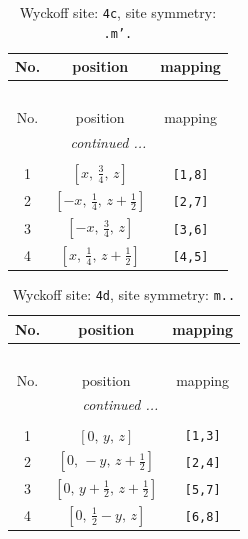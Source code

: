 \documentclass[fleqn,8pt]{jsarticle}
\begin{document}
\renewcommand{\arraystretch}{1.2}
\begin{longtable}{ccc}
\caption{Wyckoff site: {\tt 4c}, site symmetry: {\tt .m'.}}
 \\
 \hline \hline
No. & position & mapping \\ \hline \endfirsthead

\multicolumn{2}{l}{\tablename\ \thetable{}} \\
 \hline \hline
No. & position & mapping \\ \hline \endhead

 \hline \hline
\multicolumn{2}{r}{\footnotesize\it continued ...} \\ \endfoot

 \hline \hline
\multicolumn{2}{r}{} \\ \endlastfoot

1 & $\left[ x,\, \frac{3}{4},\, z \right]$ & {\tt [1,8]} \\ \hline
2 & $\left[ - x,\, \frac{1}{4},\, z + \frac{1}{2} \right]$ & {\tt [2,7]} \\ \hline
3 & $\left[ - x,\, \frac{3}{4},\, z \right]$ & {\tt [3,6]} \\ \hline
4 & $\left[ x,\, \frac{1}{4},\, z + \frac{1}{2} \right]$ & {\tt [4,5]} \\
\end{longtable}
\renewcommand{\arraystretch}{1.2}
\begin{longtable}{ccc}
\caption{Wyckoff site: {\tt 4d}, site symmetry: {\tt m..}}
 \\
 \hline \hline
No. & position & mapping \\ \hline \endfirsthead

\multicolumn{2}{l}{\tablename\ \thetable{}} \\
 \hline \hline
No. & position & mapping \\ \hline \endhead

 \hline \hline
\multicolumn{2}{r}{\footnotesize\it continued ...} \\ \endfoot

 \hline \hline
\multicolumn{2}{r}{} \\ \endlastfoot

1 & $\left[ 0,\, y,\, z \right]$ & {\tt [1,3]} \\ \hline
2 & $\left[ 0,\, - y,\, z + \frac{1}{2} \right]$ & {\tt [2,4]} \\ \hline
3 & $\left[ 0,\, y + \frac{1}{2},\, z + \frac{1}{2} \right]$ & {\tt [5,7]} \\ \hline
4 & $\left[ 0,\, \frac{1}{2} - y,\, z \right]$ & {\tt [6,8]} \\
\end{longtable}
\end{document}
